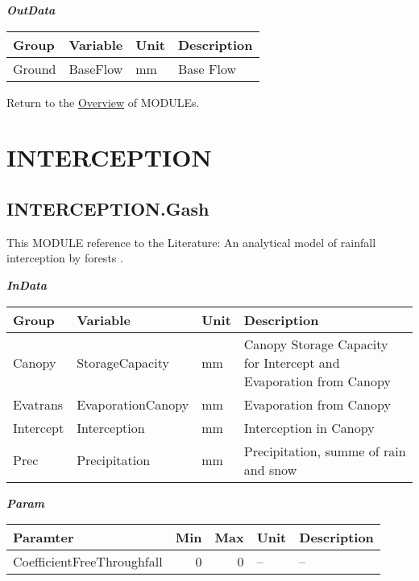 \documentclass[
]{book}
\begin{document}
\textbf{\emph{OutData}}

\begin{table}[!h]
\centering
\begin{tabular}{l|l|l|l}
\hline
Group & Variable & Unit & Description\\
\hline
Ground & BaseFlow & mm & Base Flow\\
\hline
\end{tabular}
\end{table}

Return to the \protect\hyperlink{module}{Overview} of MODULEs.

\hypertarget{INTERCEPTION}{%
\section{INTERCEPTION}\label{INTERCEPTION}}

\hypertarget{INTERCEPTION.Gash}{%
\subsection{INTERCEPTION.Gash}\label{INTERCEPTION.Gash}}

This MODULE reference to the Literature: An analytical model of rainfall interception by forests \citep{Gash.1979}.

\textbf{\emph{InData}}

\begin{table}[!h]
\centering
\begin{tabular}{l|l|l|l}
\hline
Group & Variable & Unit & Description\\
\hline
Canopy & StorageCapacity & mm & Canopy Storage Capacity for Intercept and Evaporation from Canopy\\
\cline{1-4}
Evatrans & EvaporationCanopy & mm & Evaporation from Canopy\\
\cline{1-4}
Intercept & Interception & mm & Interception in Canopy\\
\cline{1-4}
Prec & Precipitation & mm & Precipitation, summe of rain and snow\\
\hline
\end{tabular}
\end{table}

\textbf{\emph{Param}}

\begin{table}[!h]
\centering
\begin{tabular}{l|r|r|l|l}
\hline
Paramter & Min & Max & Unit & Description\\
\hline
CoefficientFreeThroughfall & 0 & 0 & -- & --\\
\hline
\end{tabular}
\end{table}
\end{document}
